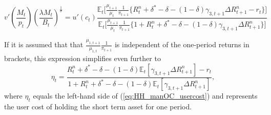 \documentclass[11pt,a4paper,margin=1.5in]{article}
\begin{document}
\begin{equation}
	v'\!\!\left(\frac{M_t}{p_t}\right)\!\!\left(\frac{\lambda M_t}{B_t}\right)^\frac{1}{\sigma} = u'(c_t)\frac{\mathbb{E}_t \Big[ \frac{\mu_{t+1}}{\mu_{t}}\frac{1}{\pi_{t+1}} \Big\{ R^n_t + \delta^* - \delta - (1-\delta)\gamma_{3,t+1}\Delta R^n_{t+1} - r_t \Big\}\Big]}{\mathbb{E}_t \Big[ \frac{\mu_{t+1}}{\mu_{t}}\frac{1}{\pi_{t+1}} \Big\{ 1+ R^n_t + \delta^* - \delta - (1-\delta)\gamma_{3,t+1}\Delta R^n_{t+1}\Big\}\Big]}
\end{equation}

If it is assumed that that $\frac{\mu_{1,t+1}}{\mu_{1,t}} \frac{1}{\pi_{t+1}}$ is independent of the one-period returns in brackets, this expression simplifies even further to 
\begin{equation}
	\eta_t = \frac{R^n_t + \delta^* - \delta - (1-\delta)\mathbb{E}_t[\gamma_{3,t+1}\Delta R^n_{t+1}] - r_t }{ 1+ R^n_t + \delta^* - \delta - (1-\delta)\mathbb{E}_t[\gamma_{3,t+1}\Delta R^n_{t+1}]},
	\label{eq:usercost_ST}
\end{equation}
where $\eta_t$ equals the left-hand side of (\ref{eq:HH_manOC_usercost}) and represents the user cost of holding the short term asset for one period.
\end{document}
